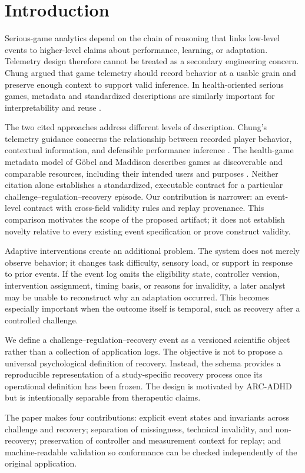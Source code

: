 \section{Introduction}

Serious-game analytics depend on the chain of reasoning that links low-level events to higher-level claims about performance, learning, or adaptation. Telemetry design therefore cannot be treated as a secondary engineering concern. Chung \parencite{chung2015telemetry} argued that game telemetry should record behavior at a usable grain and preserve enough context to support valid inference. In health-oriented serious games, metadata and standardized descriptions are similarly important for interpretability and reuse \parencite{gobel2017metadata}.

The two cited approaches address different levels of description. Chung's telemetry guidance concerns the relationship between recorded player behavior, contextual information, and defensible performance inference \parencite{chung2015telemetry}. The health-game metadata model of G\"{o}bel and Maddison describes games as discoverable and comparable resources, including their intended users and purposes \parencite{gobel2017metadata}. Neither citation alone establishes a standardized, executable contract for a particular challenge--regulation--recovery episode. Our contribution is narrower: an event-level contract with cross-field validity rules and replay provenance. This comparison motivates the scope of the proposed artifact; it does not establish novelty relative to every existing event specification or prove construct validity.

Adaptive interventions create an additional problem. The system does not merely observe behavior; it changes task difficulty, sensory load, or support in response to prior events. If the event log omits the eligibility state, controller version, intervention assignment, timing basis, or reasons for invalidity, a later analyst may be unable to reconstruct why an adaptation occurred. This becomes especially important when the outcome itself is temporal, such as recovery after a controlled challenge.

We define a challenge--regulation--recovery event as a versioned scientific object rather than a collection of application logs. The objective is not to propose a universal psychological definition of recovery. Instead, the schema provides a reproducible representation of a study-specific recovery process once its operational definition has been frozen. The design is motivated by ARC-ADHD but is intentionally separable from therapeutic claims.

The paper makes four contributions: explicit event states and invariants across challenge and recovery; separation of missingness, technical invalidity, and non-recovery; preservation of controller and measurement context for replay; and machine-readable validation so conformance can be checked independently of the original application.

